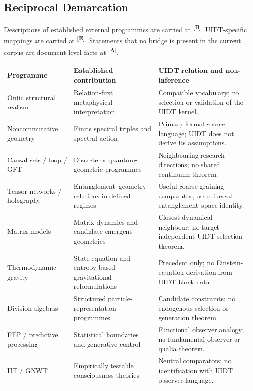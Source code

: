 \documentclass[12pt,a4paper,twoside]{article}
\theoremstyle{plain}
\theoremstyle{definition}
\theoremstyle{remark}
\newcommand{\catmark}[1]{\textsuperscript{\textsf{\textbf{[#1]}}}}
\begin{document}
\subsection{Reciprocal Demarcation}
\label{subsec:ctx-reciprocal-demarcation}

Descriptions of established external programmes are carried at
\catmark{B}. UIDT-specific mappings are carried at \catmark{E}. Statements
that no bridge is present in the current corpus are document-level facts at
\catmark{A}.

\begin{table}[H]
\centering
\small
\renewcommand{\arraystretch}{1.22}
\begin{tabular}{@{}p{}p{}p{}@{}}
\toprule
\textbf{Programme} & \textbf{Established contribution} &
\textbf{UIDT relation and non-inference}\\
\midrule
Ontic structural realism & Relation-first metaphysical interpretation &
Compatible vocabulary; no selection or validation of the UIDT kernel.\\
Noncommutative geometry & Finite spectral triples and spectral action &
Primary formal source language; UIDT does not derive its assumptions.\\
Causal sets / loop / GFT & Discrete or quantum-geometric programmes &
Neighbouring research directions; no shared continuum theorem.\\
Tensor networks / holography & Entanglement--geometry relations in defined regimes &
Useful coarse-graining comparator; no universal entanglement--space identity.\\
Matrix models & Matrix dynamics and candidate emergent geometries &
Closest dynamical neighbour; no target-independent UIDT selection theorem.\\
Thermodynamic gravity & State-equation and entropy-based gravitational reformulations &
Precedent only; no Einstein-equation derivation from UIDT block data.\\
Division algebras & Structured particle-representation programmes &
Candidate constraints; no endogenous selection or generation theorem.\\
FEP / predictive processing & Statistical boundaries and generative control &
Functional observer analogy; no fundamental observer or qualia theorem.\\
IIT / GNWT & Empirically testable consciousness theories &
Neutral comparators; no identification with UIDT observer language.\\

\end{tabular}
\end{table}
\end{document}
